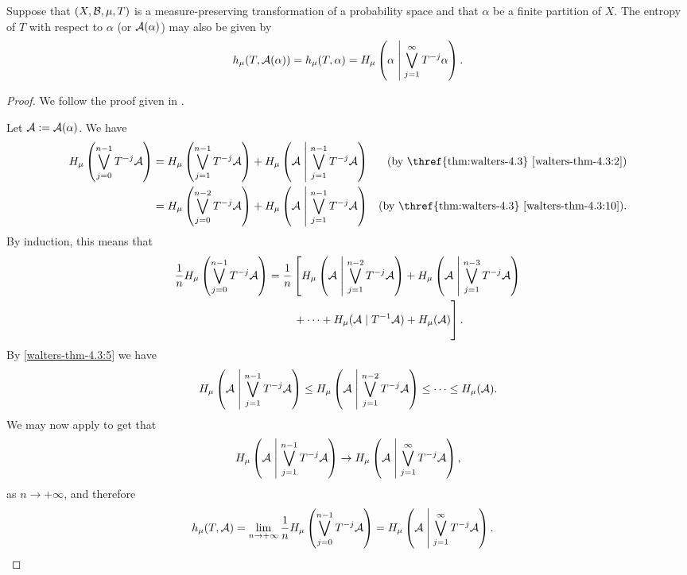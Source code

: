 \begin{theorem}
	Suppose that $(X, \mathcal{B}, \mu, T)$ is a measure-preserving transformation of a probability space and that $\alpha$ be a finite partition of $X$. The entropy of $T$ with respect to $\alpha$ (or $\mathcal{A}(\alpha)$) may also be given by
	\[
		h_\mu(T, \mathcal{A}(\alpha)) = h_\mu(T, \alpha) = H_\mu\left(\alpha \mathrel{}\middle|\mathrel{} \bigvee_{j = 1}^\infty {T^{-j}{\alpha}}\right).
	\]
	\begin{proof}
		We follow the proof given in \cite[Lecture 24]{ergodic-lectures}.
		
		Let $\mathcal{A} := \mathcal{A}(\alpha)$. We have
		\begin{align*}
			H_\mu\left(\bigjoin_{j = 0}^{n - 1}{T^{-j}{\A}}\right) &= H_\mu\left(\bigjoin_{j = 1}^{n - 1}{T^{-j}{\A}}\right) + H_\mu\left(\A \midmid \bigjoin_{j = 1}^{n - 1}{T^{-j}{\A}}\right) & \text{(by \thref{thm:walters-4.3} \ref{walters-thm-4.3:2})} \\
				&= H_\mu\left(\bigjoin_{j = 0}^{n - 2}{T^{-j}{\A}}\right) + H_\mu\left(\A \midmid \bigjoin_{j = 1}^{n - 1}{T^{-j}{\A}}\right) & \text{(by \thref{thm:walters-4.3} \ref{walters-thm-4.3:10})}.
		\end{align*}
		By induction, this means that
		\begin{align*}
			\frac{1}{n} H_\mu\left(\bigjoin_{j = 0}^{n - 1}{T^{-j}{\A}}\right) &= \frac{1}{n}\left[H_\mu\left(\A \midmid \bigjoin_{j = 1}^{n - 2}{T^{-j}{\A}}\right) + H_\mu\left(\A \midmid \bigjoin_{j = 1}^{n - 3}{T^{-j}{\A}}\right)\right. \\
				& \left. \vphantom{\bigjoin_{j = 1}^{n - 2}{T^{-j}{\A}}} \qquad + \dots + H_\mu(\A \mid T^{-1}{\A}) + H_\mu(\A)\right].
		\end{align*}
		By  \ref{walters-thm-4.3:5} we have
		\[
			H_\mu\left(\mathcal{A} \mathrel{}\middle|\mathrel{} \bigvee_{j = 1}^{n - 1}{T^{-j}{\mathcal{A}}}\right) \leq H_\mu\left(\mathcal{A} \mathrel{}\middle|\mathrel{} \bigvee_{j = 1}^{n - 2}{T^{-j}{\mathcal{A}}}\right) \leq \dots \leq H_\mu(\mathcal{A}).
		\]
		We may now apply  to get that
		\[
			H_\mu\left(\mathcal{A} \mathrel{}\middle|\mathrel{} \bigvee_{j = 1}^{n - 1}{T^{-j}{\mathcal{A}}}\right) \to H_\mu\left(\mathcal{A} \mathrel{}\middle|\mathrel{} \bigvee_{j = 1}^\infty{T^{-j}{\mathcal{A}}}\right),
		\]
		as $n \to +\infty$, and therefore
		\begin{align*}
			h_\mu(T, \mathcal{A}) = \lim_{n \to +\infty}{\frac{1}{n} H_\mu\left(\bigvee_{j = 0}^{n - 1}{}T^{-j}{\mathcal{A}}\right)} &= H_\mu\left(\mathcal{A} \mathrel{}\middle|\mathrel{} \bigvee_{j = 1}^\infty{T^{-j}{\mathcal{A}}}\right).
		\end{align*}
	\end{proof}
\end{theorem}

